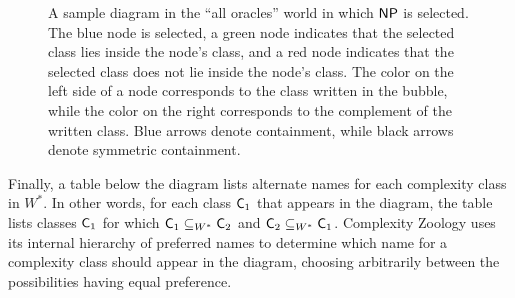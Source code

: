 \begin{figure}[htb]
  \caption{\label{NP-selected} A sample diagram in the ``all oracles'' world in which 
  $\mathsf{NP}$ is selected. The blue node is selected, a green node indicates that the selected 
  class lies inside the node's class, and a red node indicates that the selected class 
  does not lie inside the node's class. The color on the left side of a node corresponds 
  to the class written in the bubble, while the color on the right corresponds to the 
  complement of the written class. Blue arrows denote containment, while black arrows 
  denote symmetric containment.}
\end{figure}

Finally, a table below the diagram lists alternate names for each complexity
class in $W^*$. In other words, for each class $\mathsf{C}_1$ that appears in the
diagram, the table lists classes $\mathsf{C}_1$ for which $\mathsf{C}_1\subseteq_{W^*}\mathsf{C}_2$
and $\mathsf{C}_2\subseteq_{W^*}\mathsf{C}_1$. Complexity Zoology uses its internal hierarchy
of preferred names to determine which name for a complexity class should appear
in the diagram, choosing arbitrarily between the possibilities having equal
preference.